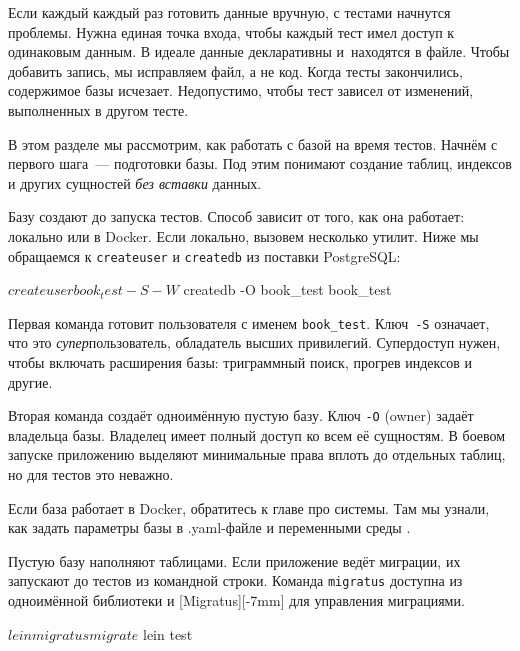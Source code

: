 Если каждый каждый раз готовить данные вручную, с тестами начнутся
проблемы. Нужна единая точка входа, чтобы каждый тест имел доступ к одинаковым
данным. В идеале данные декларативны и~находятся в файле. Чтобы добавить запись,
мы исправляем файл, а не код. Когда тесты закончились, содержимое базы
исчезает. Недопустимо, чтобы тест зависел от изменений, выполненных в другом
тесте.

В этом разделе мы рассмотрим, как работать с базой на время тестов. Начнём с
первого шага~--- подготовки базы. Под этим понимают создание таблиц, индексов и
других сущностей \emph{без вставки} данных.


Базу создают до запуска тестов. Способ зависит от того, как она работает:
локально или в Docker. Если локально, вызовем несколько утилит. Ниже мы
обращаемся к \verb|createuser| и \verb|createdb| из поставки PostgreSQL:

\begin{english}
  \begin{bash}
$ createuser book_test -S -W
$ createdb -O book_test book_test
  \end{bash}
\end{english}

Первая команда готовит пользователя с именем \verb|book_test|. Ключ~\verb|-S|
означает, что это \emph{супер}пользователь, обладатель высших
привилегий. Супердоступ нужен, чтобы включать расширения базы: триграммный
поиск, прогрев индексов и другие.

Вторая команда создаёт одноимённую пустую базу. Ключ \verb|-O| (owner) задаёт
владельца базы. Владелец имеет полный доступ ко всем её сущностям. В боевом
запуске приложению выделяют минимальные права вплоть до отдельных таблиц, но для
тестов это неважно.


Если база работает в Docker, обратитесь к главе про системы. Там мы узнали, как
задать параметры базы в .yaml-файле и переменными среды .


Пустую базу наполняют таблицами. Если приложение ведёт миграции, их запускают до
тестов из командной строки. Команда \verb|migratus| доступна из одноимённой
библиотеки и [Migratus][-7mm]
для управления миграциями.

\begin{english}
  \begin{clojure}
$ lein migratus migrate
$ lein test
  \end{clojure}
\end{english}

